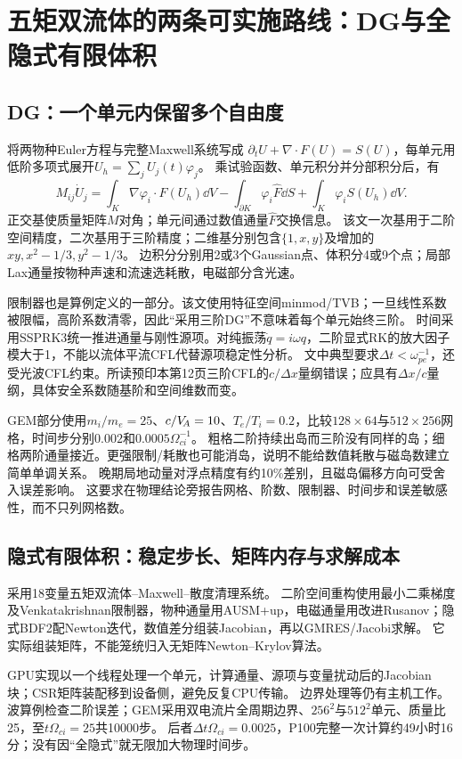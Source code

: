 \section{五矩双流体的两条可实施路线：DG与全隐式有限体积}
\subsection{DG：一个单元内保留多个自由度}
\citet{L156}将两物种Euler方程与完整Maxwell系统写成
$\partial_tU+\nabla\cdot F(U)=S(U)$，每单元用低阶多项式展开$U_h=\sum_jU_j(t)\varphi_j$。
乘试验函数、单元积分并分部积分后，有
\begin{equation}
 M_{ij}\dot U_j=\int_K\nabla\varphi_i\cdot F(U_h)\dd V
 -\int_{\partial K}\varphi_i\widehat F\dd S+\int_K\varphi_iS(U_h)\dd V.
\end{equation}
正交基使质量矩阵$M$对角；单元间通过数值通量$\widehat F$交换信息。
该文一次基用于二阶空间精度，二次基用于三阶精度；二维基分别包含$\{1,x,y\}$及增加的$xy,x^2-1/3,y^2-1/3$。
边积分分别用2或3个Gaussian点、体积分4或9个点；局部Lax通量按物种声速和流速选耗散，电磁部分含光速。

限制器也是算例定义的一部分。该文使用特征空间minmod/TVB；一旦线性系数被限幅，高阶系数清零，因此“采用三阶DG”不意味着每个单元始终三阶。
时间采用SSPRK3统一推进通量与刚性源项。对纯振荡$\dot q=i\omega q$，二阶显式RK的放大因子模大于1，不能以流体平流CFL代替源项稳定性分析。
文中典型要求$\Delta t<\omega_{pe}^{-1}$，还受光波CFL约束。所读预印本第12页三阶CFL的$c/\Delta x$量纲错误；应具有$\Delta x/c$量纲，具体安全系数随基阶和空间维数而变。

GEM部分使用$m_i/m_e=25$、$c/V_{\!A}=10$、$T_e/T_i=0.2$，比较$128\times64$与$512\times256$网格，时间步分别$0.002$和$0.0005\Omega_{ci}^{-1}$。
粗格二阶持续出岛而三阶没有同样的岛；细格两阶通量接近。更强限制/耗散也可能消岛，说明不能给数值耗散与磁岛数建立简单单调关系。
晚期局地动量对浮点精度有约10\%差别，且磁岛偏移方向可受舍入误差影响。
这要求在物理结论旁报告网格、阶数、限制器、时间步和误差敏感性，而不只列网格数。

\subsection{隐式有限体积：稳定步长、矩阵内存与求解成本}
\citet{L243}采用18变量五矩双流体--Maxwell--散度清理系统。
二阶空间重构使用最小二乘梯度及Venkatakrishnan限制器，物种通量用AUSM+up，电磁通量用改进Rusanov；隐式BDF2配Newton迭代，数值差分组装Jacobian，再以GMRES/Jacobi求解。
它实际组装矩阵，不能笼统归入无矩阵Newton--Krylov算法。

GPU实现以一个线程处理一个单元，计算通量、源项与变量扰动后的Jacobian块；CSR矩阵装配移到设备侧，避免反复CPU传输。
边界处理等仍有主机工作。波算例检查二阶误差；GEM采用双电流片全周期边界、$256^2$与$512^2$单元、质量比25，至$t\Omega_{ci}=25$共10000步。
后者$\Delta t\Omega_{ci}=0.0025$，P100完整一次计算约49小时16分；没有因“全隐式”就无限加大物理时间步。


